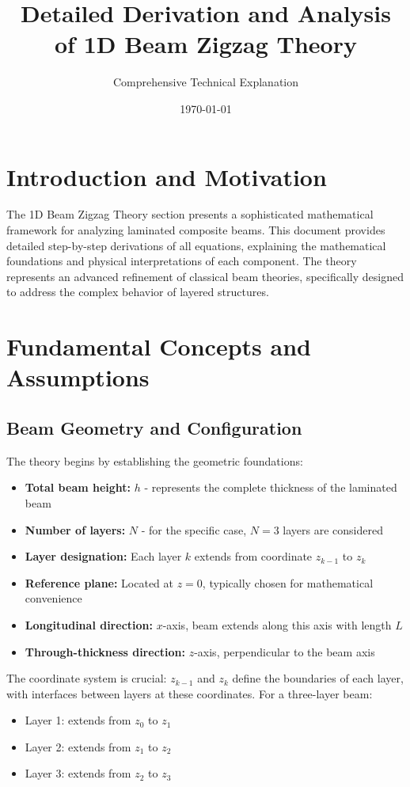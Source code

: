 \documentclass[12pt,a4paper]{article}
\title{Detailed Derivation and Analysis of 1D Beam Zigzag Theory}
\author{Comprehensive Technical Explanation}
\date{\today}
\begin{document}
\maketitle

\section{Introduction and Motivation}

The 1D Beam Zigzag Theory section presents a sophisticated mathematical framework for analyzing laminated composite beams. This document provides detailed step-by-step derivations of all equations, explaining the mathematical foundations and physical interpretations of each component. The theory represents an advanced refinement of classical beam theories, specifically designed to address the complex behavior of layered structures.

\section{Fundamental Concepts and Assumptions}

\subsection{Beam Geometry and Configuration}

The theory begins by establishing the geometric foundations:

\begin{itemize}
\item \textbf{Total beam height:} $h$ - represents the complete thickness of the laminated beam
\item \textbf{Number of layers:} $N$ - for the specific case, $N=3$ layers are considered
\item \textbf{Layer designation:} Each layer $k$ extends from coordinate $z_{k-1}$ to $z_k$
\item \textbf{Reference plane:} Located at $z=0$, typically chosen for mathematical convenience
\item \textbf{Longitudinal direction:} $x$-axis, beam extends along this axis with length $L$
\item \textbf{Through-thickness direction:} $z$-axis, perpendicular to the beam axis
\end{itemize}

The coordinate system is crucial: $z_{k-1}$ and $z_k$ define the boundaries of each layer, with interfaces between layers at these coordinates. For a three-layer beam:
\begin{itemize}
\item Layer 1: extends from $z_0$ to $z_1$
\item Layer 2: extends from $z_1$ to $z_2$
\item Layer 3: extends from $z_2$ to $z_3$
\end{itemize}
\end{document}
